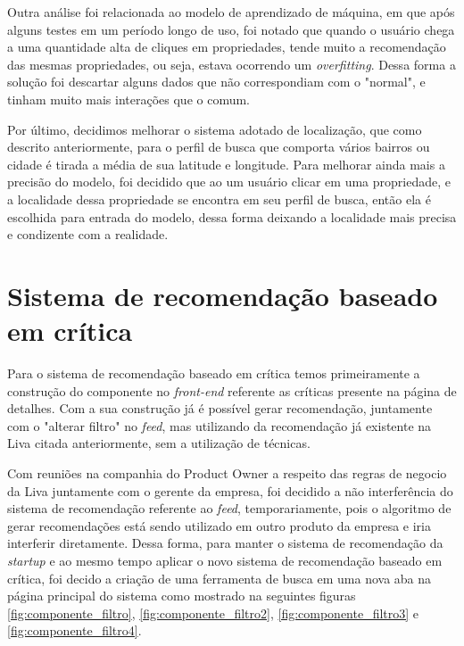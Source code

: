 Outra análise foi relacionada ao modelo de aprendizado de máquina, em que após alguns testes em um período longo de uso, foi notado que quando o usuário chega a uma quantidade alta de cliques em propriedades, tende muito a recomendação das mesmas propriedades, ou seja, estava ocorrendo um \textit{overfitting}. Dessa forma a solução foi descartar alguns dados que não correspondiam com o "normal", e tinham muito mais interações  que o comum.

Por último, decidimos melhorar o sistema adotado de localização, que como descrito anteriormente, para o perfil de busca que comporta vários bairros ou cidade é tirada a média de sua latitude e longitude. Para melhorar ainda mais a precisão do modelo, foi decidido que ao um usuário clicar em uma propriedade, e a localidade dessa propriedade se encontra em seu perfil de busca, então ela é escolhida para entrada do modelo, dessa forma deixando a localidade mais precisa e condizente com a realidade.

\section{Sistema de recomendação baseado em crítica}

Para o sistema de recomendação baseado em crítica temos primeiramente a construção do componente no \textit{front-end} referente as críticas presente na página de detalhes. Com a sua construção já é possível gerar recomendação, juntamente com o "alterar filtro" no \textit{feed}, mas utilizando da recomendação já existente na Liva citada anteriormente, sem a utilização de técnicas.

Com reuniões na companhia do Product Owner a respeito das regras de negocio da Liva juntamente com o gerente da empresa, foi decidido a não interferência do sistema de recomendação referente ao \textit{feed}, temporariamente, pois o algoritmo de gerar recomendações está sendo utilizado em outro produto da empresa e iria interferir diretamente. Dessa forma, para manter o sistema de recomendação da \textit{startup} e ao mesmo tempo aplicar o novo sistema de recomendação baseado em crítica, foi decido a criação de uma ferramenta de busca em uma nova aba na página principal do sistema como mostrado na seguintes figuras \ref{fig:componente_filtro}, \ref{fig:componente_filtro2}, \ref{fig:componente_filtro3} e \ref{fig:componente_filtro4}.

